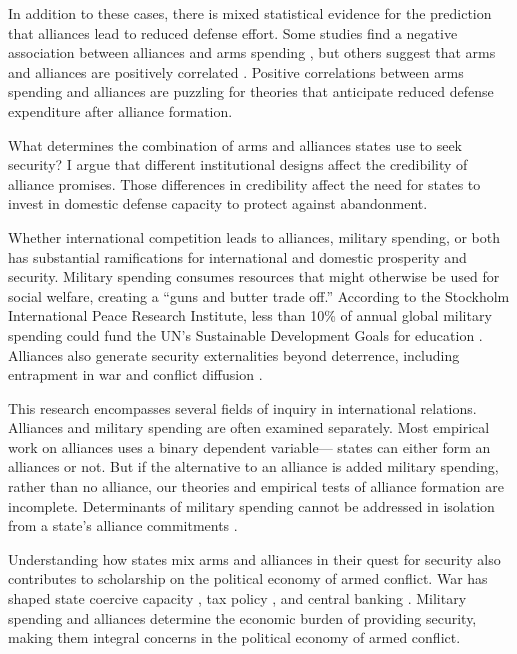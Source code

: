 \documentclass[12pt]{article}
\begin{document}
In addition to these cases, there is mixed statistical evidence for the prediction that alliances lead to reduced defense effort. Some studies find a negative association between alliances and arms spending \citep{Conybeare1992, Morrow1993, Kimball2010, DigiuseppePoast2016}, but others suggest that arms and alliances are positively correlated \citep{Diehl1994, Horowitzetal2017}. Positive correlations between arms spending and alliances are puzzling for theories that anticipate reduced defense expenditure after alliance formation. 

What determines the combination of arms and alliances states use to seek security? I argue that different institutional designs affect the credibility of alliance promises. Those differences in credibility affect the need for states to invest in domestic defense capacity to protect against abandonment. 
 
Whether international competition leads to alliances, military spending, or both has substantial ramifications for international and domestic prosperity and security. Military spending consumes resources that might otherwise be used for social welfare, creating a ``guns and butter trade off.'' According to the Stockholm International Peace Research Institute, less than 10\% of annual global military spending could fund the UN's Sustainable Development Goals for education \citep{SIPRI2016}. Alliances also generate security externalities beyond deterrence, including entrapment in war \citep{Snyder1984} and conflict diffusion \citep{MelinKoch2010}. 

This research encompasses several fields of inquiry in international relations. Alliances and military spending are often examined separately. Most empirical work on alliances uses a binary dependent variable--- states can either form an alliances or not. But if the alternative to an alliance is added military spending, rather than no alliance, our theories and empirical tests of alliance formation are incomplete. Determinants of military spending cannot be addressed in isolation from a state's alliance commitments \citep{Nordhausetal2012}.   

Understanding how states mix arms and alliances in their quest for security also contributes to scholarship on the political economy of armed conflict. War has shaped state coercive capacity \citep{Bean1973, Tilly1990}, tax policy \citep{Dinceccoetal2011, ScheveStasavage2012}, and central banking \citep{Poast2015}. Military spending and alliances determine the economic burden of providing security, making them integral concerns in the political economy of armed conflict.  
\end{document}
